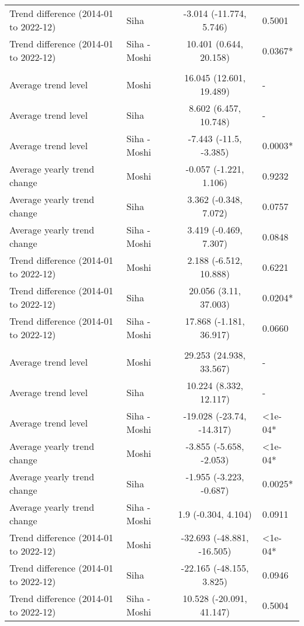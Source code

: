 \begin{longtable}{l|lcl}
Trend difference (2014-01 to 2022-12) & Siha & -3.014 (-11.774, 5.746) & 0.5001 \\ 
Trend difference (2014-01 to 2022-12) & Siha - Moshi & 10.401 (0.644, 20.158) & 0.0367* \\ 
\midrule\addlinespace[2.5pt]
\multicolumn{4}{l}{Substance Abuse} \\ 
\midrule\addlinespace[2.5pt]
Average trend level & Moshi & 16.045 (12.601, 19.489) & - \\ 
Average trend level & Siha & 8.602 (6.457, 10.748) & - \\ 
Average trend level & Siha - Moshi & -7.443 (-11.5, -3.385) & 0.0003* \\ 
Average yearly trend change & Moshi & -0.057 (-1.221, 1.106) & 0.9232 \\ 
Average yearly trend change & Siha & 3.362 (-0.348, 7.072) & 0.0757 \\ 
Average yearly trend change & Siha - Moshi & 3.419 (-0.469, 7.307) & 0.0848 \\ 
Trend difference (2014-01 to 2022-12) & Moshi & 2.188 (-6.512, 10.888) & 0.6221 \\ 
Trend difference (2014-01 to 2022-12) & Siha & 20.056 (3.11, 37.003) & 0.0204* \\ 
Trend difference (2014-01 to 2022-12) & Siha - Moshi & 17.868 (-1.181, 36.917) & 0.0660 \\ 
\midrule\addlinespace[2.5pt]
\multicolumn{4}{l}{Tuberculosis} \\ 
\midrule\addlinespace[2.5pt]
Average trend level & Moshi & 29.253 (24.938, 33.567) & - \\ 
Average trend level & Siha & 10.224 (8.332, 12.117) & - \\ 
Average trend level & Siha - Moshi & -19.028 (-23.74, -14.317) & <1e-04* \\ 
Average yearly trend change & Moshi & -3.855 (-5.658, -2.053) & <1e-04* \\ 
Average yearly trend change & Siha & -1.955 (-3.223, -0.687) & 0.0025* \\ 
Average yearly trend change & Siha - Moshi & 1.9 (-0.304, 4.104) & 0.0911 \\ 
Trend difference (2014-01 to 2022-12) & Moshi & -32.693 (-48.881, -16.505) & <1e-04* \\ 
Trend difference (2014-01 to 2022-12) & Siha & -22.165 (-48.155, 3.825) & 0.0946 \\ 
Trend difference (2014-01 to 2022-12) & Siha - Moshi & 10.528 (-20.091, 41.147) & 0.5004 \\ 

\end{longtable}
